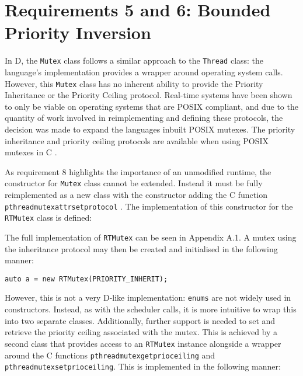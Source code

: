 \section{Requirements 5 and 6: Bounded Priority Inversion}
In D, the \texttt{Mutex} class follows a similar approach to the \texttt{Thread}
class: the language's implementation provides a wrapper around operating system 
calls. However, this \texttt{Mutex} class has no 
inherent ability to provide the Priority Inheritance or the Priority Ceiling protocol. 
Real-time systems have been shown to only be viable on operating systems that 
are POSIX compliant, and due to the quantity of work involved in reimplementing 
and defining these protocols, the decision was made to expand the languages
inbuilt POSIX mutexes. The priority inheritance and priority ceiling protocols 
are available when using POSIX mutexes in C \cite{mutex-setprotocol}. 
\par\bigskip\noindent
As requirement 8 highlights the importance of an unmodified runtime, the 
constructor for \texttt{Mutex} class cannot be extended. Instead it must be fully 
reimplemented as a new class with the constructor adding 
the C function \texttt{pthread\textunderscore{}mutexattr\textunderscore{}setprotocol} 
\cite{mutex-setprotocol}. 
The implementation of this constructor for the \texttt{RTMutex} class is defined:

The full implementation of \texttt{RTMutex} can be seen in Appendix A.1. 
A mutex using the inheritance protocol may then be created and initialised in 
the following manner: 
\begin{lstlisting}[basicstyle=\small]
auto a = new RTMutex(PRIORITY_INHERIT);
\end{lstlisting}
However, this is not a very D-like implementation: \texttt{enums} are not widely used 
in constructors. Instead, as with the scheduler calls, 
it is more intuitive to wrap this into two separate classes. Additionally, 
further support 
is needed to set and retrieve the priority ceiling associated with the 
mutex. 
This is achieved by a second class that provides access to an \texttt{RTMutex}
instance alongside a wrapper around the C functions 
\texttt{pthread\textunderscore{}mutex\textunderscore{}getprioceiling} and 
\texttt{pthread\textunderscore{}mutex\textunderscore{}setprioceiling}.
This is implemented in the following manner: 

